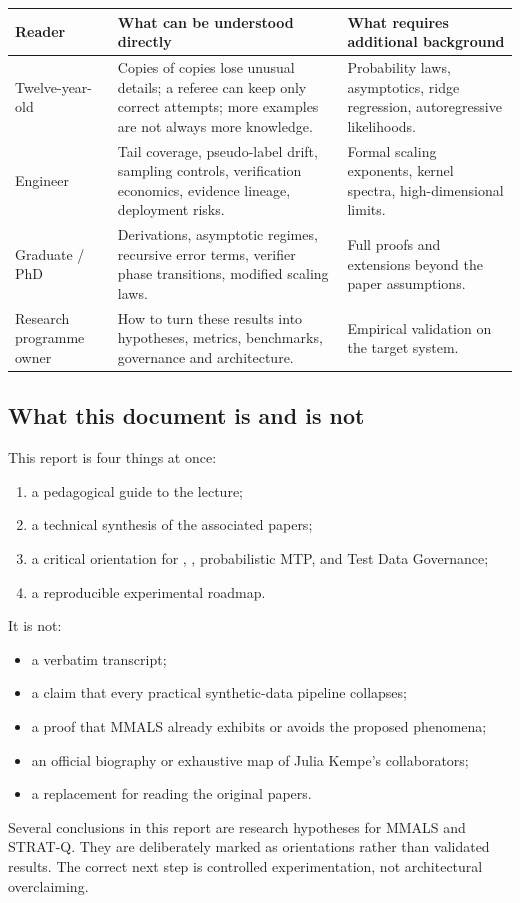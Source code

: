 \begin{longtable}{p{}p{}p{}}
\toprule
\textbf{Reader} & \textbf{What can be understood directly} & \textbf{What requires additional background} \\
\midrule
Twelve-year-old & Copies of copies lose unusual details; a referee can keep only correct attempts; more examples are not always more knowledge. & Probability laws, asymptotics, ridge regression, autoregressive likelihoods. \\
Engineer & Tail coverage, pseudo-label drift, sampling controls, verification economics, evidence lineage, deployment risks. & Formal scaling exponents, kernel spectra, high-dimensional limits. \\
Graduate / PhD & Derivations, asymptotic regimes, recursive error terms, verifier phase transitions, modified scaling laws. & Full proofs and extensions beyond the paper assumptions. \\
Research programme owner & How to turn these results into hypotheses, metrics, benchmarks, governance and architecture. & Empirical validation on the target system. \\
\bottomrule
\end{longtable}

\subsection{What this document is and is not}

This report is four things at once:

\begin{enumerate}[leftmargin=*]
  \item a pedagogical guide to the lecture;
  \item a technical synthesis of the associated papers;
  \item a critical orientation for \MMALS, \STRATQ, probabilistic MTP, and Test Data Governance;
  \item a reproducible experimental roadmap.
\end{enumerate}

It is not:

\begin{itemize}[leftmargin=*]
  \item a verbatim transcript;
  \item a claim that every practical synthetic-data pipeline collapses;
  \item a proof that MMALS already exhibits or avoids the proposed phenomena;
  \item an official biography or exhaustive map of Julia Kempe's collaborators;
  \item a replacement for reading the original papers.
\end{itemize}

\begin{cautionbox}
Several conclusions in this report are research hypotheses for MMALS and STRAT-Q. They are deliberately marked as orientations rather than validated results. The correct next step is controlled experimentation, not architectural overclaiming.
\end{cautionbox}
